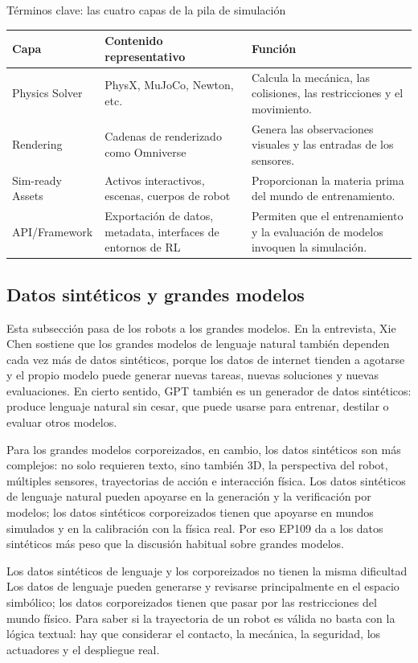 \documentclass[a4paper]{article}
\begin{document}
\begin{knowledgebox}{Términos clave: las cuatro capas de la pila de simulación}
\begin{tabularx}{\textwidth}{p{}p{}X}
\toprule
Capa & Contenido representativo & Función \\
\midrule
Physics Solver & PhysX, MuJoCo, Newton, etc. & Calcula la mecánica, las colisiones, las restricciones y el movimiento. \\
Rendering & Cadenas de renderizado como Omniverse & Genera las observaciones visuales y las entradas de los sensores. \\
Sim-ready Assets & Activos interactivos, escenas, cuerpos de robot & Proporcionan la materia prima del mundo de entrenamiento. \\
API/Framework & Exportación de datos, metadata, interfaces de entornos de RL & Permiten que el entrenamiento y la evaluación de modelos invoquen la simulación. \\
\bottomrule
\end{tabularx}
\end{knowledgebox}

\subsection{Datos sintéticos y grandes modelos}

Esta subsección pasa de los robots a los grandes modelos. En la entrevista, Xie Chen sostiene que los grandes modelos de lenguaje natural también dependen cada vez más de datos sintéticos, porque los datos de internet tienden a agotarse y el propio modelo puede generar nuevas tareas, nuevas soluciones y nuevas evaluaciones. En cierto sentido, GPT también es un generador de datos sintéticos: produce lenguaje natural sin cesar, que puede usarse para entrenar, destilar o evaluar otros modelos.

Para los grandes modelos corporeizados, en cambio, los datos sintéticos son más complejos: no solo requieren texto, sino también 3D, la perspectiva del robot, múltiples sensores, trayectorias de acción e interacción física. Los datos sintéticos de lenguaje natural pueden apoyarse en la generación y la verificación por modelos; los datos sintéticos corporeizados tienen que apoyarse en mundos simulados y en la calibración con la física real. Por eso EP109 da a los datos sintéticos más peso que la discusión habitual sobre grandes modelos.

\begin{warningbox}{Los datos sintéticos de lenguaje y los corporeizados no tienen la misma dificultad}
Los datos de lenguaje pueden generarse y revisarse principalmente en el espacio simbólico; los datos corporeizados tienen que pasar por las restricciones del mundo físico. Para saber si la trayectoria de un robot es válida no basta con la lógica textual: hay que considerar el contacto, la mecánica, la seguridad, los actuadores y el despliegue real.
\end{warningbox}
\end{document}

